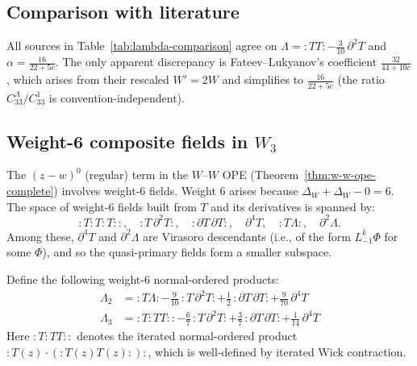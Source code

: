 \subsection{Comparison with literature}

All sources in Table~\ref{tab:lambda-comparison} agree on $\Lambda = {:}TT{:} - \tfrac{3}{10}\,\partial^2 T$ and $\alpha = \tfrac{16}{22+5c}$.  The only apparent discrepancy is Fateev--Lukyanov's coefficient $\frac{32}{44+10c}$, which arises from their rescaled $W' = 2W$ and simplifies to $\frac{16}{22+5c}$ (the ratio $C_{33}^{\Lambda}/C_{33}^{1}$ is convention-independent).

\subsection{\texorpdfstring{Weight-6 composite fields in $W_3$}{Weight-6 composite fields in W3}}
\label{sec:w3-deg4-composites}

The $(z-w)^0$ (regular) term in the $W$--$W$ OPE
(Theorem~\ref{thm:w-w-ope-complete}) involves weight-6 fields.
Weight 6 arises because $\Delta_W + \Delta_W - 0 = 6$.  The space
of weight-6 fields built from $T$ and its derivatives is spanned by:
\[
{:}T{:}T{:}T{:}{:},\quad {:}T\,\partial^2 T{:},\quad {:}\partial T\,\partial T{:},
\quad \partial^4 T, \quad {:}T\Lambda{:},\quad \partial^2\Lambda.
\]
Among these, $\partial^4 T$ and $\partial^2\Lambda$ are Virasoro descendants
(i.e., of the form $L_{-1}^k\Phi$ for some $\Phi$), and so the quasi-primary
fields form a smaller subspace.

\begin{definition}\label{def:w3-weight6-composites}
Define the following weight-6 normal-ordered products:
\begin{align}
\Lambda_2 &= {:}T\Lambda{:} - \tfrac{9}{10}\,{:}T\,\partial^2 T{:}
  + \tfrac{1}{2}\,{:}\partial T\,\partial T{:}
  + \tfrac{9}{70}\,\partial^4 T \label{eq:lambda2-def} \\
\Lambda_3 &= {:}T{:}TT{:}{:} - \tfrac{6}{7}\,{:}T\,\partial^2 T{:}
  + \tfrac{3}{7}\,{:}\partial T\,\partial T{:}
  + \tfrac{1}{14}\,\partial^4 T \label{eq:lambda3-def}
\end{align}
Here ${:}T{:}TT{:}{:}$ denotes the iterated normal-ordered product
$:T(z)\cdot(:T(z)T(z):):$, which is well-defined by iterated Wick contraction.
\end{definition}

